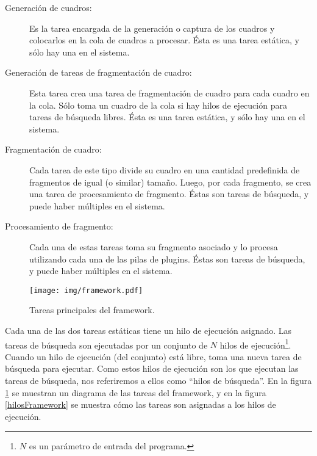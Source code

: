 \begin{description}

	\item[Generación de cuadros:] Es la tarea encargada de la generación o
		captura de los cuadros y colocarlos en la cola de cuadros a
		procesar. Ésta es una tarea estática, y sólo hay una en el
		sistema.

	\item[Generación de tareas de fragmentación de cuadro:] Esta tarea crea
		una tarea de fragmentación de cuadro para cada cuadro en la
		cola. Sólo toma un cuadro de la cola si hay hilos de ejecución
		para tareas de búsqueda libres. Ésta es una tarea estática, y
		sólo hay una en el sistema.

	\item[Fragmentación de cuadro:] Cada tarea de este tipo divide su cuadro
		en una cantidad predefinida de fragmentos de igual (o similar)
		tamaño. Luego, por cada fragmento, se crea una tarea de
		procesamiento de fragmento. Éstas son tareas de búsqueda, y
		puede haber múltiples en el sistema.

	\item[Procesamiento de fragmento:] Cada una de estas tareas toma su
		fragmento asociado y lo procesa utilizando cada una de las pilas
		de plugins. Éstas son tareas de búsqueda, y puede haber
		múltiples en el sistema.

\end{description}

\begin{figure}[!htb]

	\centering

	\texttt{[image: img/framework.pdf]}

	\caption{Tareas principales del framework.}

	\label{tareasFramework}

\end{figure}

Cada una de las dos tareas estáticas tiene un hilo de ejecución asignado. Las
tareas de búsqueda son ejecutadas por un conjunto de $N$ hilos de
ejecución\footnote{$N$ es un parámetro de entrada del programa.}. Cuando un hilo
de ejecución (del conjunto) está libre, toma una nueva tarea de búsqueda para
ejecutar. Como estos hilos de ejecución son los que ejecutan las tareas de
búsqueda, nos referiremos a ellos como ``hilos de búsqueda''. En la figura
\ref{tareasFramework} se muestran un diagrama de las tareas del framework, y en
la figura \ref{hilosFramework} se muestra cómo las tareas son asignadas a los
hilos de ejecución.

